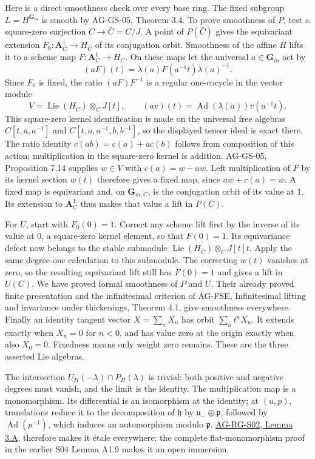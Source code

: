 \documentclass[11pt,a4paper,openany]{report}
\begin{document}
Here is a direct smoothness check over every base ring. The fixed subgroup \(L=H^{\mathbf G_m}\) is smooth by AG-GS-05, Theorem 3.4. To prove smoothness of \(P\), test a square-zero surjection \(C\to\bar C=C/J\). A point of \(P(\bar C)\) gives the equivariant extension \(F_0:\mathbf A^1_{\bar C}\to H_{\bar C}\) of its conjugation orbit. Smoothness of the affine \(H\) lifts it to a scheme map \(F:\mathbf A^1_C\to H_C\). On these maps let the universal \(a\in\mathbf G_m\) act by \[
(aF)(t)=\lambda(a)F(a^{-1}t)\lambda(a)^{-1}.
\] Since \(F_0\) is fixed, the ratio \((aF)F^{-1}\) is a regular one-cocycle in the vector module \[
V=\operatorname{Lie}(H_{\bar C})\otimes_{\bar C}J[t],
\qquad (av)(t)=\operatorname{Ad}(\lambda(a))v(a^{-1}t).
\] This square-zero kernel identification is made on the universal free algebras \(C[t,a,a^{-1}]\) and \(C[t,a,a^{-1},b,b^{-1}]\), so the displayed tensor ideal is exact there. The ratio identity \(c(ab)=c(a)+a c(b)\) follows from composition of this action; multiplication in the square-zero kernel is addition. AG-GS-05, Proposition 7.14 supplies \(w\in V\) with \(c(a)=w-aw\). Left multiplication of \(F\) by its kernel section \(w(t)\) therefore gives a fixed map, since \(aw+c(a)=w\). A fixed map is equivariant and, on \(\mathbf G_{m,C}\), is the conjugation orbit of its value at \(1\). Its extension to \(\mathbf A^1_C\) thus makes that value a lift in \(P(C)\).

For \(U\), start with \(F_0(0)=1\). Correct any scheme lift first by the inverse of its value at \(0\), a square-zero kernel element, so that \(F(0)=1\). Its equivariance defect now belongs to the stable submodule \(\operatorname{Lie}(H_{\bar C})\otimes_{\bar C}J[t]t\). Apply the same degree-one calculation to this submodule. The correcting \(w(t)\) vanishes at zero, so the resulting equivariant lift still has \(F(0)=1\) and gives a lift in \(U(C)\). We have proved formal smoothness of \(P\) and \(U\). Their already proved finite presentation and the infinitesimal criterion of AG-FSE, Infinitesimal lifting and invariance under thickenings, Theorem 4.1, give smoothness everywhere. Finally an identity tangent vector \(X=\sum_n X_n\) has orbit \(\sum_n t^nX_n\). It extends exactly when \(X_n=0\) for \(n<0\), and has value zero at the origin exactly when also \(X_0=0\). Fixedness means only weight zero remains. These are the three asserted Lie algebras.

The intersection \(U_H(-\lambda)\cap P_H(\lambda)\) is trivial: both positive and negative degrees must vanish, and the limit is the identity. The multiplication map is a monomorphism. Its differential is an isomorphism at the identity; at \((u,p)\), translations reduce it to the decomposition of \(\mathfrak h\) by \(\mathfrak u_-\oplus\mathfrak p\), followed by \(\operatorname{Ad}(p^{-1})\), which induces an automorphism modulo \(\mathfrak p\). \href{AG-RG-S02.html\#smooth-map-differential}{AG-RG-S02, Lemma 3.A}, therefore makes it étale everywhere; the complete flat-monomorphism proof in the earlier S04 Lemma A1.9 makes it an open immersion.
\end{document}
